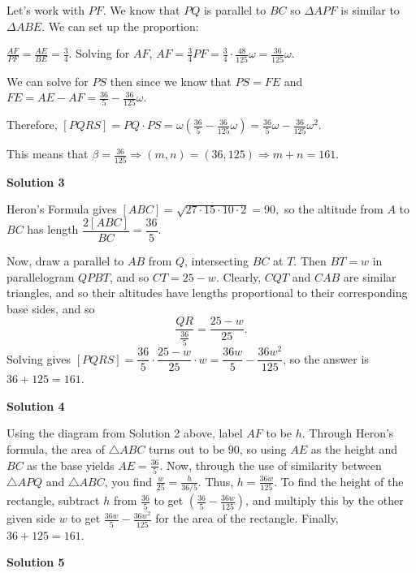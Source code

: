 \begin{enumerate}
 Let's work with $PF$. We know that $PQ$ is parallel to $BC$ so $\Delta APF$ is similar to $\Delta ABE$. We can set up the proportion:

 $\frac{AF}{PF}=\frac{AE}{BE}=\frac{3}{4}$. Solving for $AF$, $AF = \frac{3}{4} PF = \frac{3}{4} \cdot \frac{48}{125} \omega = \frac{36}{125} \omega$. 

 We can solve for $PS$ then since we know that $PS=FE$ and $FE= AE - AF = \frac{36}{5} - \frac{36}{125} \omega$.

 Therefore, $[PQRS] = PQ \cdot PS = \omega (\frac{36}{5} - \frac{36}{125} \omega) = \frac{36}{5}\omega - \frac{36}{125} \omega^2$.

 This means that $\beta = \frac{36}{125} \Rightarrow (m,n) = (36,125) \Rightarrow m+n = \boxed{161}$.

 



\textbf{Solution 3}

Heron's Formula gives $[ABC] = \sqrt{27 \cdot 15 \cdot 10 \cdot 2} = 90,$ so the altitude from $A$ to $BC$ has length $\dfrac{2[ABC]}{BC} = \dfrac{36}{5}.$

 Now, draw a parallel to $AB$ from $Q$, intersecting $BC$ at $T$. Then $BT = w$ in parallelogram $QPBT$, and so $CT = 25 - w$. Clearly, $CQT$ and $CAB$ are similar triangles, and so their altitudes have lengths proportional to their corresponding base sides, and so
 \[\frac{QR}{\frac{36}{5}} = \frac{25 - w}{25}.\]Solving gives $[PQRS] = \dfrac{36}{5} \cdot \dfrac{25 - w}{25} \cdot w = \dfrac{36w}{5} - \dfrac{36w^2}{125}$, so the answer is $36 + 125 = 161$.

 



\textbf{Solution 4}

Using the diagram from Solution 2 above, label $AF$ to be $h$. Through Heron's formula, the area of $\triangle ABC$ turns out to be $90$, so using $AE$ as the height and $BC$ as the base yields $AE=\frac{36}{5}$. Now, through the use of similarity between $\triangle APQ$ and $\triangle ABC$, you find $\frac{w}{25}=\frac{h}{36/5}$. Thus, $h=\frac{36w}{125}$. To find the height of the rectangle, subtract $h$ from $\frac{36}{5}$ to get $\left(\frac{36}{5}-\frac{36w}{125}\right)$, and multiply this by the other given side $w$ to get $\frac{36w}{5}-\frac{36w^2}{125}$ for the area of the rectangle. Finally, $36+125=\boxed{161}$.

 



\textbf{Solution 5}


\end{enumerate}
